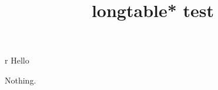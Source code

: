 \documentclass{article}
\title{longtable* test}
\begin{document}
\maketitle

\begin{longtable*}{r}
Hello\\
\end{longtable*}

\begin{table}
  Nothing.
\caption{A plain table.}
\end{table}
\end{document}
